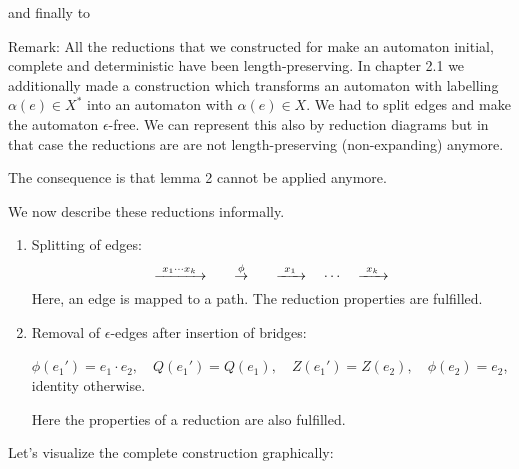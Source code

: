 and finally to

\begin{center}
\end{center}

Remark: All the reductions that we constructed for make an automaton initial,
complete and deterministic have been length-preserving. In chapter 2.1 we
additionally made a construction which transforms an automaton with labelling
$\alpha(e) \in X^*$ into an automaton with $\alpha(e) \in X$. We had to split
edges and make the automaton $\epsilon$-free. We can represent this also by
reduction diagrams but in that case the reductions are are not length-preserving
(non-expanding) anymore.

The consequence is that lemma 2 cannot be applied anymore.

We now describe these reductions informally.

\begin{enumerate}
  \item Splitting of edges:
  \[ \xrightarrow{\ {x_1 \cdots x_k}\ } \qquad\stackrel{\phi}{\to}\qquad \xrightarrow{\ {x_1}\ }\quad
  \cdots\quad \xrightarrow{\ {x_k}\ } \] Here, an edge is mapped to a path. The reduction
  properties are fulfilled.
  \item Removal of $\epsilon$-edges after insertion of bridges:
  
  \missingfigure
  
  $\phi(e_1') = e_1 \cdot e_2,\quad Q(e_1') = Q(e_1),\quad Z(e_1') =
  Z(e_2),\quad \phi(e_2) = e_2$, identity otherwise.
  
  Here the properties of a reduction are also fulfilled.
\end{enumerate}

Let's visualize the complete construction graphically:

\begin{center}
\end{center}

